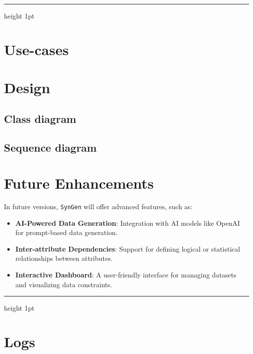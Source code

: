 \documentclass{article}
\newcommand{\horizbar}{
    \vspace{1em}
    \hrule height 1pt
    \vspace{1em}
}
\begin{document}
    \horizbar


    \section{Use-cases}


    \section{Design}

    \subsection{Class diagram}

    \subsection{Sequence diagram}


    \section{Future Enhancements}
    In future versions, \texttt{SynGen} will offer advanced features, such as:
    \begin{itemize}
        \item \textbf{AI-Powered Data Generation}: Integration with AI models like OpenAI for prompt-based data generation.
        \item \textbf{Inter-attribute Dependencies}: Support for defining logical or statistical relationships between attributes.
        \item \textbf{Interactive Dashboard}: A user-friendly interface for managing datasets and visualizing data constraints.
    \end{itemize}

    \horizbar


    \section{Logs}
\end{document}

